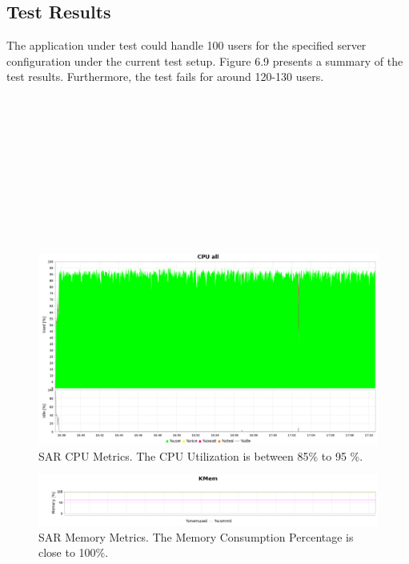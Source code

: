 \documentclass[12pt]{report}
\begin{document}
\subsection{Test Results}
The application under test could handle 100 users for the specified server configuration under the current test setup. Figure 6.9 presents a summary of the test results. Furthermore, the test fails for around 120-130 users.
\\\\\\\\\\\\\\\\\\\\\\
\begin{figure}[h!]
	\centering
	\includegraphics[width=\textwidth,height=\textheight,keepaspectratio]{intro/cpu_mridul_new.png}
	\caption{SAR CPU Metrics. The CPU Utilization is between 85\% to 95 \%.}
\end{figure}
\begin{figure}[h!]
	\centering
	\includegraphics[width=\textwidth,height=\textheight,keepaspectratio]{intro/mem_mridul_new.png}
	\caption{SAR Memory Metrics. The Memory Consumption Percentage is close to 100\%.}
\end{figure}
\end{document}
